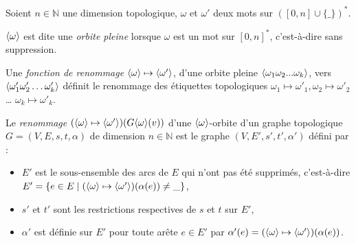 \begin{definition}[Renommage]\label{def:renommage-orbite}%
	Soient $n \in \mathbb{N}$ une dimension topologique, $\omega$ et $\omega'$ deux mots sur $([0,n] \cup \{ \_ \})^*$.

	$\langle\omega\rangle$ est dite une \emph{orbite pleine} lorsque $\omega$ est un mot sur $[0,n]^*$, c'est-à-dire sans suppression.

	Une \emph{fonction de renommage} $\langle\omega\rangle \mapsto \langle\omega'\rangle$, d'une orbite pleine
	$\langle\omega_1 \omega_2 ... \omega_k\rangle$, vers $\langle\omega'_1 \omega'_2 \dots \omega'_k\rangle$ définit
	le renommage des étiquettes topologiques $\omega_1 \mapsto \omega'_1, \omega_2 \mapsto \omega'_2$ \ldots
	$\omega_k \mapsto \omega'_k$. %

	Le \emph{renommage} $(\langle\omega\rangle \mapsto \langle\omega'\rangle)(G\langle\omega\rangle(v))$ d'une
	$\langle\omega\rangle$-orbite d'un graphe topologique $G=(V,E,s,t,\alpha)$ de dimension $n \in \mathbb{N}$ est le graphe
	$(V,E',s',t',\alpha')$ défini par :
	\begin{itemize}
		\item $E'$ est le sous-ensemble des arcs de $E$ qui n'ont pas été
		      supprimés, c'est-à-dire
		      $E'=\{e \in E \mid (\langle\omega\rangle \mapsto \langle\omega'\rangle)(\alpha(e)) \neq \_ \}$,

		\item $s'$ et $t'$ sont les restrictions respectives de $s$ et $t$ sur
		      $E'$,

		\item $\alpha'$ est définie sur $E'$ pour toute arête $e \in E'$ par
		      $\alpha'(e) = (\langle\omega\rangle \mapsto \langle\omega'\rangle)(\alpha(e))$.
	\end{itemize}
\end{definition}


